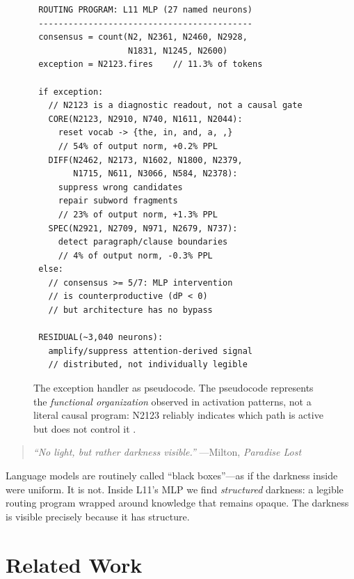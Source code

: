 \documentclass{article}
\begin{document}
\begin{figure}[t]
\centering
\small
\begin{verbatim}
 ROUTING PROGRAM: L11 MLP (27 named neurons)
 -------------------------------------------
 consensus = count(N2, N2361, N2460, N2928,
                   N1831, N1245, N2600)
 exception = N2123.fires    // 11.3% of tokens

 if exception:
   // N2123 is a diagnostic readout, not a causal gate
   CORE(N2123, N2910, N740, N1611, N2044):
     reset vocab -> {the, in, and, a, ,}
     // 54% of output norm, +0.2% PPL
   DIFF(N2462, N2173, N1602, N1800, N2379,
        N1715, N611, N3066, N584, N2378):
     suppress wrong candidates
     repair subword fragments
     // 23% of output norm, +1.3% PPL
   SPEC(N2921, N2709, N971, N2679, N737):
     detect paragraph/clause boundaries
     // 4% of output norm, -0.3% PPL
 else:
   // consensus >= 5/7: MLP intervention
   // is counterproductive (dP < 0)
   // but architecture has no bypass

 RESIDUAL(~3,040 neurons):
   amplify/suppress attention-derived signal
   // distributed, not individually legible
\end{verbatim}
\caption{The exception handler as pseudocode. The pseudocode represents the
\emph{functional organization} observed in activation patterns, not a literal
causal program: N2123 reliably indicates which path is active but does not
control it \citep{balogh2026discrete}.}
\label{fig:pseudocode}
\end{figure}

\begin{quote}
\emph{``No light, but rather darkness visible.''}
\hfill ---Milton, \emph{Paradise Lost}
\end{quote}

\noindent Language models are routinely called ``black boxes''---as if the darkness
inside were uniform.
It is not.
Inside L11's MLP we find \emph{structured} darkness: a legible routing
program wrapped around knowledge that remains opaque.
The darkness is visible precisely because it has structure.

\section{Related Work}
\end{document}
